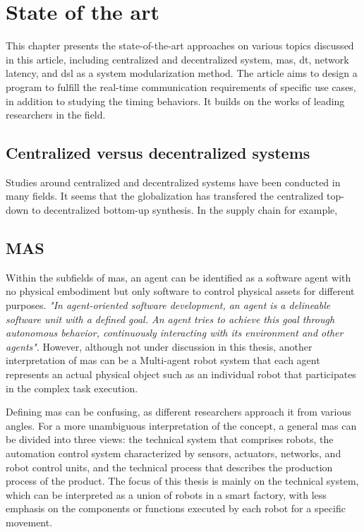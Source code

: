 \chapter{State of the art}%
This chapter presents the state-of-the-art approaches on various topics 
discussed 
in this article, including centralized and decentralized system, 
\gls{mas}, \gls{dt}, network latency, 
and \gls{dsl} as a system modularization method. The article aims to 
design a program to fulfill the real-time communication requirements 
of specific use cases, in addition to studying the timing behaviors. 
It builds on the works of leading researchers in the field.


\section{Centralized versus decentralized systems}
Studies around centralized and decentralized systems have been conducted 
in many fields. It seems that the globalization has transfered the 
centralized top-down to decentralized bottom-up synthesis\cite{ueda_emergent_2004}.   
In the supply chain for example, 


\section{MAS}

Within the subfields of \gls{mas}, an agent can be identified as a 
software agent with no physical embodiment but only software to control 
physical assets for different purposes. \textit{"In agent-oriented software 
development, an agent is a delineable software unit with a defined goal. 
An agent tries to achieve this goal through autonomous behavior, 
continuously interacting with its environment and other agents"}\cite{wagner_agentenunterstutztes_2008}. 
However, although not under discussion in this thesis, another 
interpretation of \gls{mas} can be a Multi-agent robot system that 
each agent represents an actual physical object such as an individual 
robot that participates in the complex task execution\cite{ota_multi-agent_2006}.   


Defining \gls{mas} can be confusing, as different researchers approach 
it from various angles. For a more unambiguous interpretation of the 
concept, a general \gls{mas} can be divided into three views: the 
technical system that comprises robots, the automation control system 
characterized by sensors, actuators, networks, and robot control units, 
and the technical process that describes the production process of the 
product\cite{lauber_prozessautomatisierung_1999}\cite{wannagat_agent_nodate}. 
The focus of this thesis is mainly on the technical system, which can 
be interpreted as a union of robots in a smart factory, with less 
emphasis on the components or functions executed by each robot for 
a specific movement.

